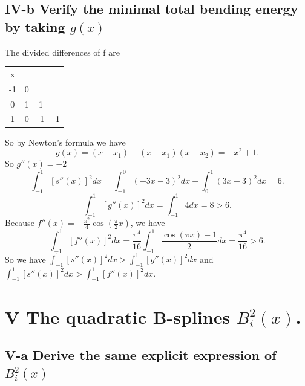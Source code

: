 \documentclass[twoside,a4paper]{article}
\begin{document}
 \subsection*{IV-b \small{Verify the minimal total bending energy by taking $g\left( x \right) $}}

 The divided differences of f are

\begin{tabular}{c|ccc}
x\\
-1 &0\\
0  &1  &1\\
1  &0  &-1  &-1\\
\end{tabular}

So by Newton's formula we have 
\[
g\left( x \right)=\left( x-x_1 \right)-\left( x-x_1 \right)\left( x-x_2 \right)=-x^2+1  
.\] 
So $g''\left( x \right)=-2 $
\[
	\int_{-1}^{1}[s''\left( x \right)]^2dx=\int_{-1}^{0}\left( -3x-3 \right)^2dx+\int_{0}^{1}\left( 3x-3 \right)^2dx
	=6
.\] 
\[
	\int_{-1}^{1}[g''\left( x \right) ]^2dx=\int_{-1}^{1}4dx=8>6 
.\] 
Because $f''\left( x \right)=-\frac{\pi^2}{4}\cos\left( \frac{\pi}{2}x \right)  $, we have
\[
	\int_{-1}^{1}[f''\left( x \right)]^2dx=\frac{\pi^{4}}{16}\int_{-1}^{1}\frac{\cos\left( \pi x \right)-1 }{2}dx 
=\frac{\pi^{4}}{16}>6
.\] 
So we have $\int_{-1}^{1}[s''\left( x \right)]^2dx>\int_{-1}^{1}[g''\left( x \right)]^2dx  $
and $\int_{-1}^{1}[s''\left( x \right)]^2dx>\int_{-1}^{1}[f''\left( x \right)]^2dx $.

\section*{V \small{The quadratic B-splines $B^{2}_i\left( x \right) $.}}

\subsection*{V-a \small{Derive the same explicit expression of $B^{2}_i\left( x \right) $}}
\end{document}

